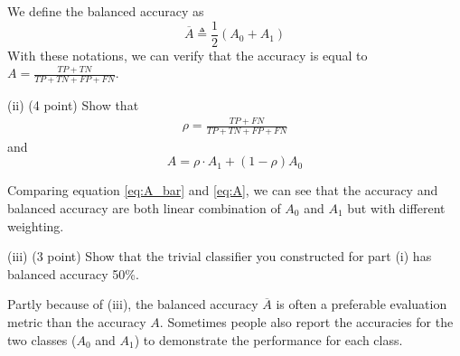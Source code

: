 We define the balanced accuracy as 
\begin{equation}
\overline{A} \triangleq \frac{1}{2} \left(A_0+A_1\right)
\label{eq:A_bar}
\end{equation}
With these notations, we can verify that the accuracy is equal to $
A =\frac{TP+TN}{TP+TN + FP+FN} $. 

(ii) (4 point) Show that 
\begin{align*}
\rho = \frac{TP + FN}{TP+TN + FP+FN}
\end{align*}
and 
\begin{equation}
A = \rho \cdot A_1 + (1-\rho)A_0
\label{eq:A}
\end{equation}


Comparing equation \eqref{eq:A_bar} and \eqref{eq:A}, we can see that the accuracy and balanced accuracy are both linear combination of $A_0$ and $A_1$ but with different weighting. 

(iii) (3 point) Show that the trivial classifier you constructed for part (i) has balanced accuracy 50\%. 

Partly because of (iii), the balanced accuracy $\overline{A}$ is often a preferable evaluation metric than the accuracy $A$. Sometimes people also report the accuracies for the two classes ($A_0$ and $A_1$) to demonstrate the performance for each class. 